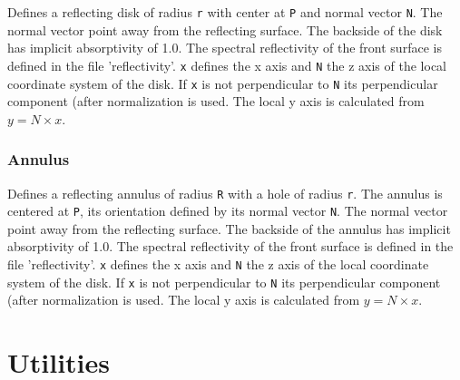 \documentclass[10pt,a4paper,titlepage]{article}
\begin{document}







Defines a reflecting disk of radius {\tt r} with center at {\tt P} and normal vector {\tt N}. The normal vector point away from the reflecting surface. The backside of the disk has implicit absorptivity of 1.0. The spectral reflectivity of the front surface is defined in the file 'reflectivity'. {\tt x} defines the x axis and {\tt N} the z axis of the local coordinate system of the disk. If {\tt x} is not perpendicular to {\tt N} its perpendicular component (after normalization is used. The local y axis is calculated from $y = N \times x$.

\subsubsection{Annulus}









Defines a reflecting annulus of radius {\tt R} with a hole of radius {\tt r}. The annulus is centered at {\tt P}, its orientation defined by its normal vector {\tt N}. The normal vector point away from the reflecting surface. The backside of the annulus has implicit absorptivity of 1.0. The spectral reflectivity of the front surface is defined in the file 'reflectivity'. {\tt x} defines the x axis and {\tt N} the z axis of the local coordinate system of the disk. If {\tt x} is not perpendicular to {\tt N} its perpendicular component (after normalization is used. The local y axis is calculated from $y = N \times x$.


\section{Utilities}
\end{document}
